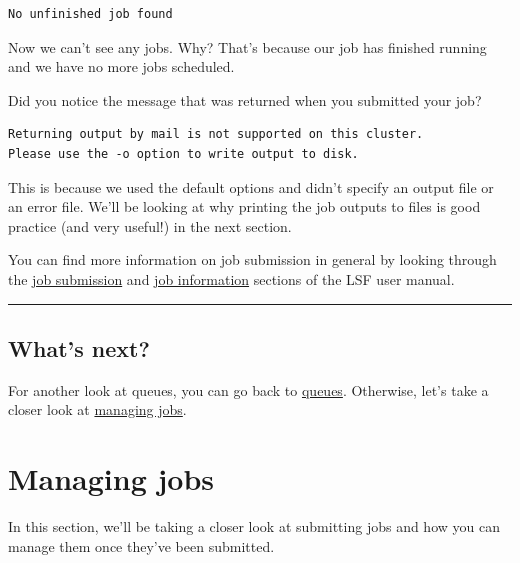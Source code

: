 \documentclass[11pt]{article}
\begin{document}
    \begin{verbatim}
No unfinished job found
\end{verbatim}

    Now we can't see any jobs. Why? That's because our job has finished
running and we have no more jobs scheduled.

Did you notice the message that was returned when you submitted your
job?

    \begin{verbatim}
Returning output by mail is not supported on this cluster.
Please use the -o option to write output to disk.
\end{verbatim}

    This is because we used the default options and didn't specify an output
file or an error file. We'll be looking at why printing the job outputs
to files is good practice (and very useful!) in the next section.

You can find more information on job submission in general by looking
through the
\href{https://www.ibm.com/support/knowledgecenter/SSETD4_9.1.3/lsf_users_guide/job_submit.html}{job
submission} and
\href{https://www.ibm.com/support/knowledgecenter/SSETD4_9.1.3/lsf_admin/job_info_view_lsf.html}{job
information} sections of the LSF user manual.

    \begin{center}\rule{0.5\linewidth}{\linethickness}\end{center}

    \subsection{What's next?}\label{whats-next}

For another look at queues, you can go back to
\href{queues.ipynb}{queues}. Otherwise, let's take a closer look at
\href{managing_jobs.ipynb}{managing jobs}.





\newpage






    \section{Managing jobs}\label{managing-jobs}

    In this section, we'll be taking a closer look at submitting jobs and
how you can manage them once they've been submitted.
\end{document}
